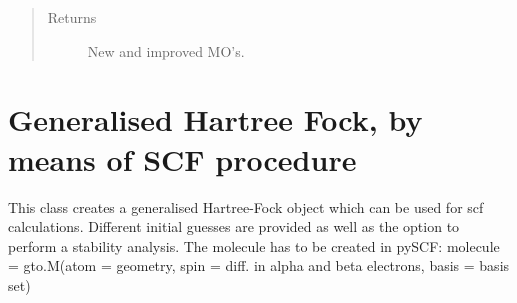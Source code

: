 \documentclass[letterpaper,10pt,english]{sphinxmanual}
\begin{document}
\begin{fulllineitems}
\begin{fulllineitems}
\begin{sphinxVerbatim}[commandchars=\\\{\}]
           
   
  
\end{sphinxVerbatim}
\begin{quote}\begin{description}
\item[{Returns}] \leavevmode
New and improved MO’s.

\end{description}\end{quote}

\end{fulllineitems}


\end{fulllineitems}

\label{\detokenize{GHF:module-ghf.GHF}}

\chapter{Generalised Hartree Fock, by means of SCF procedure}
\label{\detokenize{GHF:generalised-hartree-fock-by-means-of-scf-procedure}}\label{\detokenize{GHF::doc}}
This class creates a generalised Hartree-Fock object which can be used for scf calculations. Different initial guesses
are provided as well as the option to perform a stability analysis.
The molecule has to be created in pySCF:
molecule = gto.M(atom = geometry, spin = diff. in alpha and beta electrons, basis = basis set)
\end{document}
